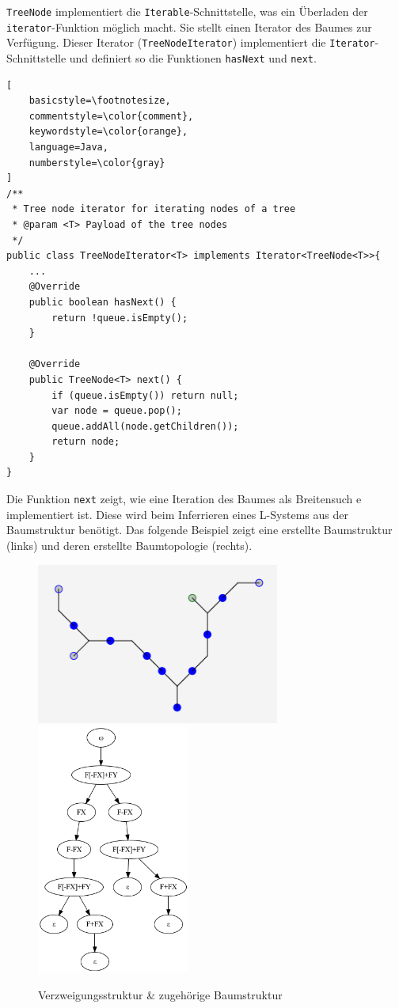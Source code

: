 \texttt{TreeNode} implementiert die \texttt{Iterable}-Schnittstelle, was ein Überladen der \texttt{iterator}-Funktion möglich
macht.
Sie stellt einen Iterator des Baumes zur Verfügung.
Dieser Iterator (\texttt{TreeNodeIterator}) implementiert die \texttt{Iterator}-Schnittstelle und definiert so die Funktionen
\texttt{hasNext} und \texttt{next}.
\begin{lstlisting}[
    basicstyle=\footnotesize,
    commentstyle=\color{comment},
    keywordstyle=\color{orange},
    language=Java,
    numberstyle=\color{gray}
]
/**
 * Tree node iterator for iterating nodes of a tree
 * @param <T> Payload of the tree nodes
 */
public class TreeNodeIterator<T> implements Iterator<TreeNode<T>>{
    ...
    @Override
    public boolean hasNext() {
        return !queue.isEmpty();
    }

    @Override
    public TreeNode<T> next() {
        if (queue.isEmpty()) return null;
        var node = queue.pop();
        queue.addAll(node.getChildren());
        return node;
    }
}
\end{lstlisting}
Die Funktion \texttt{next} zeigt, wie eine Iteration des Baumes als Breitensuch e implementiert ist.
Diese wird beim Inferrieren eines L-Systems aus der Baumstruktur benötigt.
Das folgende Beispiel zeigt eine erstellte Baumstruktur (links) und deren erstellte Baumtopologie (rechts).
\begin{figure}[H]
    \centering
    \includegraphics[width=8cm]{../images/graph_tree.png}
    \includegraphics[width=5cm]{../images/tree_graph.png}
    \caption{Verzweigungsstruktur \& zugehörige Baumstruktur}
\end{figure}

